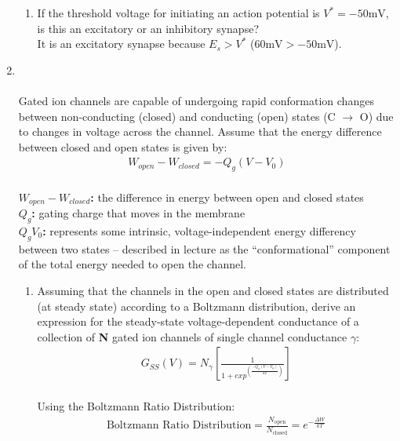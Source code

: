 \documentclass[11pt]{article}
\begin{document}
\begin{enumerate}[label=\arabic*.]
\begin{enumerate}[label=(\alph*)]
\item
If the threshold voltage for initiating an action potential is $V^* = -50 \text{mV}$, is this an excitatory or an inhibitory synapse?
\vspace*{1\baselineskip}
\\
It is an excitatory synapse because $E_s > V^{*}$ ($60 \text{mV} > -50 \text{mV}$).
\end{enumerate}



\newpage
\item
\underline{}
\\
\\
Gated ion channels are capable of undergoing rapid conformation changes between non-conducting (closed) and conducting (open) states (C $\rightarrow$ O) due to changes in voltage across the channel. Assume that the energy difference between closed and open states is given by:
\begin{align*}
W_{open} - W_{closed} = -Q_g \left(V - V_0\right)
\end{align*}
\underline{}
\\
\textbf{$W_{open} - W_{closed}$:} the difference in energy between open and closed states \\
\textbf{$Q_g$:} gating charge that moves in the membrane \\
\textbf{$Q_g V_0$:} represents some intrinsic, voltage-independent energy differency between two states – described in lecture as the ``conformational'' component of the total energy needed to open the channel.
\begin{enumerate}[label=(\alph*)]
\item
Assuming that the channels in the open and closed states are distributed (at steady state) according to a Boltzmann distribution, derive an expression for the steady-state voltage-dependent conductance of a collection of \textbf{N} gated ion channels of single channel conductance $\gamma$:
\begin{align*}
G_{SS}(V) = N_{\gamma}\left[\frac{1} {1 + exp^{\left(\frac{-Q_g \left(V - V_0\right)} {kT}\right)}}\right]
\end{align*}
\vspace*{1\baselineskip}
\\
Using the Boltzmann Ratio Distribution:
\begin{align*}
\text{Boltzmann Ratio Distribution} = \frac{N_{\text{open}}} {N_{\text{closed}}} = e ^ {- \frac{\Delta W} {k T}}
\end{align*}

\end{enumerate}
\end{enumerate}
\end{document}
